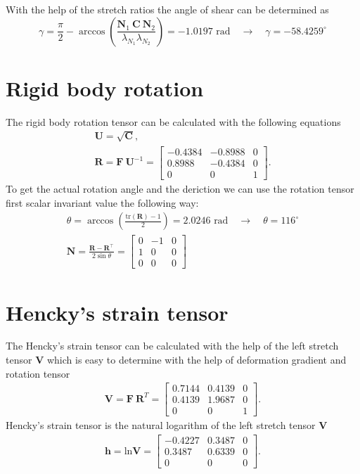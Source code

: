 \documentclass[12pt]{article}
\begin{document}
With the help of the stretch ratios the angle of shear can be determined as
\begin{equation}
  \gamma = \dfrac{\pi}{2} - \arccos \left( \dfrac{\textbf{N}_1 ~ \textbf{C} ~ \textbf{N}_2}{\lambda_{N_1} \lambda_{N_2}} \right) = -1.0197 \text{ rad} \quad \rightarrow \quad \gamma = -58.4259 ^\circ
\end{equation}

\section{Rigid body rotation}
The rigid body rotation tensor can be calculated with the following equations
\begin{gather}
  \mathbf{U} = \sqrt{\mathbf{C}}, \\
  \mathbf{R} = \mathbf{F} ~ \mathbf{U}^{-1} = \begin{bmatrix}
    -0.4384 & -0.8988 & 0 \\
    0.8988 & -0.4384 & 0 \\
    0 & 0 & 1
  \end{bmatrix}.
\end{gather}
To get the actual rotation angle and the deriction we can use the rotation tensor first scalar invariant value the following way:
\begin{gather}
  \theta = \arccos\left(\frac{\text{tr}(\mathbf{R}) - 1}{2}\right) = 2.0246 \text{ rad} \quad \rightarrow \quad \theta = 116^\circ \\
  \mathbf{N} = \frac{\mathbf{R} - \mathbf{R}^\top}{2\sin\theta} = \begin{bmatrix}
    0 & -1 & 0 \\
    1 & 0 & 0 \\
    0 & 0 & 0
  \end{bmatrix}
\end{gather}

\section{Hencky’s strain tensor}
The Hencky’s strain tensor can be calculated with the help of the left stretch tensor $\textbf{V}$ which is easy to determine with the help of deformation gradient and rotation tensor
\begin{gather}
  \textbf{V} = \textbf{F} ~ \textbf{R}^T  = \begin{bmatrix}
    0.7144 & 0.4139 & 0 \\
    0.4139 & 1.9687 & 0 \\
    0 & 0 & 1
  \end{bmatrix}.
\end{gather}
Hencky’s strain tensor is the natural logarithm of the left stretch tensor $\textbf{V}$
\begin{gather}
  \textbf{h} = \text{ln} \textbf{V} = \begin{bmatrix}
    -0.4227 & 0.3487 & 0 \\
    0.3487 & 0.6339 & 0 \\
    0 & 0 & 0
  \end{bmatrix}.
\end{gather}
\end{document}
